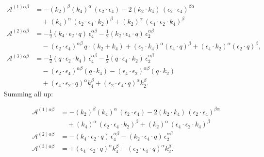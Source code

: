 \documentclass[12pt,a4paper,oneside]{article}
\numberwithin{equation}{section}   %
\begin{document}
\begin{align}
\mathcal{A}^{(1)\alpha\beta}
&=
-(k_2)^\beta (k_4)^\alpha\,(\epsilon_2\!\cdot\!\epsilon_4)
-2(k_2\!\cdot\!k_4)\,(\epsilon_2\!\cdot\!\epsilon_4)^{\beta\alpha}
\nonumber\\
&\quad
+(k_4)^\alpha\,(\epsilon_2\!\cdot\!\epsilon_4\!\cdot\!k_2)^\beta
+(k_2)^\alpha\,(\epsilon_4\!\cdot\!\epsilon_2\!\cdot\!k_4)^\beta
\\[1ex]
\mathcal{A}^{(2)\alpha\beta}
&=
-\frac12
(k_4\!\cdot\!\epsilon_2\!\cdot\!q)\,
\epsilon_4^{\alpha\beta}
-\frac12
(k_2\!\cdot\!\epsilon_4\!\cdot\!q)\,
\epsilon_2^{\alpha\beta}
\nonumber\\
&\quad
-(\epsilon_2\!\cdot\!\epsilon_4)^{\alpha\beta}\,
q\!\cdot\!(k_2+k_4)
+(\epsilon_2\!\cdot\!k_4)^\alpha
(\epsilon_4\!\cdot\!q)^\beta
+(\epsilon_4\!\cdot\!k_2)^\alpha
(\epsilon_2\!\cdot\!q)^\beta ,
\\[1ex]
\mathcal{A}^{(3)\alpha\beta}
&=
-\frac12
(q\!\cdot\!\epsilon_2\!\cdot\!k_4)\,
\epsilon_4^{\alpha\beta}
-\frac12
(q\!\cdot\!\epsilon_4\!\cdot\!k_2)\,
\epsilon_2^{\alpha\beta}
\nonumber\\
&\quad
-(\epsilon_2\!\cdot\!\epsilon_4)^{\alpha\beta}
(q\!\cdot\!k_4)
-(\epsilon_4\!\cdot\!\epsilon_2)^{\alpha\beta}
(q\!\cdot\!k_2)
\nonumber\\
&\quad
+(\epsilon_4\!\cdot\!\epsilon_2\!\cdot\!q)^\alpha
k_4^\beta
+(\epsilon_2\!\cdot\!\epsilon_4\!\cdot\!q)^\alpha
k_2^\beta .
\end{align}
Summing all up:


\begin{align}
\mathcal{A}^{(1)\alpha\beta}
&=
-(k_2)^\beta (k_4)^\alpha\,(\epsilon_2\!\cdot\!\epsilon_4)
-2(k_2\!\cdot\!k_4)\,(\epsilon_2\!\cdot\!\epsilon_4)^{\beta\alpha}
\nonumber\\
&\quad
+(k_4)^\alpha\,(\epsilon_2\!\cdot\!\epsilon_4\!\cdot\!k_2)^\beta
+(k_2)^\alpha\,(\epsilon_4\!\cdot\!\epsilon_2\!\cdot\!k_4)^\beta
\\[1ex]
\mathcal{A}^{(2)\alpha\beta}
&=
-
(k_4\!\cdot\!\epsilon_2\!\cdot\!q)\,
\epsilon_4^{\alpha\beta}
-
(k_2\!\cdot\!\epsilon_4\!\cdot\!q)\,
\epsilon_2^{\alpha\beta}
\\[1ex]
\mathcal{A}^{(3)\alpha\beta}
&=
+(\epsilon_4\!\cdot\!\epsilon_2\!\cdot\!q)^\alpha
k_4^\beta
+(\epsilon_2\!\cdot\!\epsilon_4\!\cdot\!q)^\alpha
k_2^\beta .
\end{align}
\end{document}
